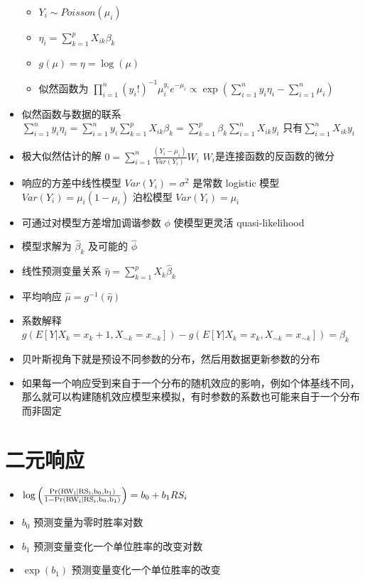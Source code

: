 \documentclass[
]{book}
\providecommand{\tightlist}{%
  \setlength{\itemsep}{0pt}\setlength{\parskip}{0pt}}
\begin{document}
\begin{itemize}
  \begin{itemize}
  \tightlist
  \item
    \(Y_i \sim Poisson(\mu_i)\)
  \item
    \(\eta_i = \sum_{k=1}^p X_{ik} \beta_k\)
  \item
    \(g(\mu) = \eta = \log(\mu)\)
  \item
    似然函数为 \(\prod_{i=1}^n (y_i !)^{-1} \mu_i^{y_i}e^{-\mu_i}\propto \exp\left(\sum_{i=1}^n y_i \eta_i - \sum_{i=1}^n \mu_i\right)\)
  \end{itemize}
\item
  似然函数与数据的联系 \(\sum_{i=1}^n y_i \eta_i = \sum_{i=1}^n y_i\sum_{k=1}^p X_{ik} \beta_k = \sum_{k=1}^p \beta_k\sum_{i=1}^n X_{ik} y_i\) 只有\(\sum_{i=1}^n X_{ik} y_i\)
\item
  极大似然估计的解 \(0=\sum_{i=1}^n \frac{(Y_i - \mu_i)}{Var(Y_i)}W_i\) \(W_i\)是连接函数的反函数的微分
\item
  响应的方差中线性模型 \(Var(Y_i) = \sigma^2\) 是常数 logistic 模型 \(Var(Y_i) = \mu_i (1 - \mu_i)\) 泊松模型 \(Var(Y_i) = \mu_i\)
\item
  可通过对模型方差增加调谐参数 \(\phi\) 使模型更灵活 quasi-likelihood
\item
  模型求解为 \(\hat \beta_k\) 及可能的 \(\hat \phi\)
\item
  线性预测变量关系 \(\hat \eta = \sum_{k=1}^p X_k \hat \beta_k\)
\item
  平均响应 \(\hat \mu = g^{-1}(\hat \eta)\)
\item
  系数解释 \(g(E[Y | X_k = x_k + 1, X_{\sim k} = x_{\sim k}]) - g(E[Y | X_k = x_k, X_{\sim k}=x_{\sim k}]) = \beta_k\)
\item
  贝叶斯视角下就是预设不同参数的分布，然后用数据更新参数的分布
\item
  如果每一个响应受到来自于一个分布的随机效应的影响，例如个体基线不同，那么就可以构建随机效应模型来模拟，有时参数的系数也可能来自于一个分布而非固定
\end{itemize}

\hypertarget{ux4e8cux5143ux54cdux5e94}{%
\section{二元响应}\label{ux4e8cux5143ux54cdux5e94}}

\begin{itemize}
\tightlist
\item
  \(\log\left(\frac{\rm{Pr}(RW_i | RS_i, b_0, b_1 )}{1-\rm{Pr}(RW_i | RS_i, b_0, b_1)}\right) = b_0 + b_1 RS_i\)
\item
  \(b_0\) 预测变量为零时胜率对数
\item
  \(b_1\) 预测变量变化一个单位胜率的改变对数
\item
  \(\exp(b_1)\) 预测变量变化一个单位胜率的改变
\end{itemize}
\end{document}
